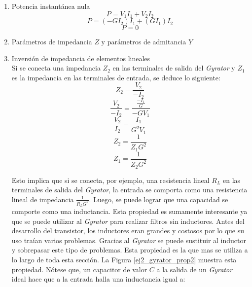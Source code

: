 \documentclass[12pt,a4paper]{article}
\begin{document}
\begin{enumerate}
	\item Potencia instantánea nula \\
        \begin{displaymath} P = V_1 I_1 + V_2 I_2 \end{displaymath}
        \begin{displaymath} P = (-G I_2)I_1 + (G I_1) I_2 \end{displaymath}
        \begin{displaymath} P = 0 \end{displaymath}
    
	\item Parámetros de impedancia $Z$ y parámetros de admitancia $Y$ \\
	\item Inversión de impedancia de elementos lineales\\
        Si se conecta una impedancia $Z_2$ en las terminales de salida del \textit{Gyrator} y $Z_1$ es la impedancia en las terminales de entrada, se deduce lo siguiente:
        \begin{displaymath} Z_2 = \frac{V_2}{-I_2} \end{displaymath}
        \begin{displaymath} \frac{V_2}{-I_2} = \frac{\frac{-I_1}{G}}{ -G V_1} \end{displaymath}
        \begin{displaymath} \frac{V_2}{I_2} = \frac{I_1}{G^2 V_1} \end{displaymath}
        \begin{displaymath} Z_2 = \frac{1}{Z_1 G^2} \end{displaymath}
        \begin{displaymath} Z_1 = \frac{1}{Z_2 G^2} \end{displaymath}

        Esto implica que si se conecta, por ejemplo, una resistencia lineal $R_L$ en las terminales de salida del \textit{Gyrator}, la entrada se comporta como
        una resistencia lineal de impedancia $ \frac{1}{R_L G^2} $. Luego, se puede lograr que una capacidad se comporte como una inductancia. Esta propiedad es sumamente interesante
        ya que se puede utilizar al \textit{Gyrator} para realizar filtros sin inductores. Antes del desarrollo del transistor, los inductores eran grandes y costosos por lo que su uso traían varios problemas. Gracias al \textit{Gyrator}
        se puede sustituir al inductor y sobrepasar este tipo de problemas. Esta propiedad es la que mas se utiliza a lo largo de toda esta sección. La Figura \ref{ej2_gyrator_prop2} muestra esta propiedad.
        Nótese que, un capacitor de valor $C$ a la salida de un \textit{Gyrator} ideal hace que a la entrada halla una inductancia igual a:


\end{enumerate}
\end{document}
